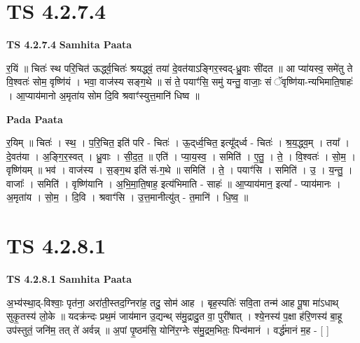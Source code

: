 \documentclass[17pt]{extarticle}
\begin{document}

\section{ TS 4.2.7.4 }

\textbf{TS 4.2.7.4 } \newline
\textbf{Samhita Paata} \newline

र॒यिं ॥ चितः॑ स्थ परि॒चित॑ ऊर्द्ध्व॒चितः॑ श्रयद्ध्वं॒ तया॑ दे॒वत॑याऽङ्गिर॒स्वद्-ध्रु॒वाः सी॑दत ॥ आ प्या॑यस्व॒ समे॑तु ते वि॒श्वतः॑ सोम॒ वृष्णि॑यं । भवा॒ वाज॑स्य सङ्ग॒थे ॥ सं ते॒ पयाꣳ॑सि॒ समु॑ यन्तु॒ वाजाः॒ सं ॅवृष्णि॑या-न्यभिमाति॒षाहः॑ । आ॒प्याय॑मानो अ॒मृता॑य सोम दि॒वि श्रवाꣳ॑स्युत्त॒मानि॑ धिष्व ॥ \newline

\textbf{Pada Paata} \newline

र॒यिम् ॥ चितः॑ । स्थ॒ । प॒रि॒चित॒ इति॑ परि - चितः॑ । ऊ॒द्‌र्ध्व॒चित॒ इत्यू᳚द्‌र्ध्व - चितः॑ । श्र॒य॒द्ध्व॒म् । तया᳚ । दे॒वत॑या । अ॒ङ्गि॒र॒स्वत् । ध्रु॒वाः । सी॒द॒त॒ ॥ एति॑ । प्या॒य॒स्व॒ । समिति॑ । ए॒तु॒ । ते॒ । वि॒श्वतः॑ । सो॒म॒ । वृष्णि॑यम् ॥ भव॑ । वाज॑स्य । स॒ङ्ग॒थ इति॑ सं-ग॒थे ॥ समिति॑ । ते॒ । पयाꣳ॑सि । समिति॑ । उ॒ । य॒न्तु॒ । वाजाः᳚ । समिति॑ । वृष्णि॑यानि । अ॒भि॒मा॒ति॒षाह॒ इत्य॑भिमाति - साहः॑ ॥ आ॒प्याय॑मान॒ इत्या᳚ - प्याय॑मानः । अ॒मृता॑य । सो॒म॒ । दि॒वि । श्रवाꣳ॑सि । उ॒त्त॒मानीत्यु॑त् - त॒मानि॑ । धि॒ष्व॒ ॥  \newline





\section{ TS 4.2.8.1 }

\textbf{TS 4.2.8.1 } \newline
\textbf{Samhita Paata} \newline

अ॒भ्य॑स्था॒द्-विश्वाः॒ पृत॑ना॒ अरा॑ती॒स्तद॒ग्निरा॑ह॒ तदु॒ सोम॑ आह । बृह॒स्पतिः॑ सवि॒ता तन्म॑ आह पू॒षा मा॑ऽधाथ् सुकृ॒तस्य॑ लो॒के ॥ यदक्र॑न्दः प्रथ॒मं जाय॑मान उ॒द्यन्थ् स॑मु॒द्रादु॒त वा॒ पुरी॑षात् । श्ये॒नस्य॑ प॒क्षा ह॑रि॒णस्य॑ बा॒हू उप॑स्तुतं॒ जनि॑म॒ तत् ते॑ अर्वन्न् ॥ अ॒पां पृ॒ष्ठम॑सि॒ योनि॑र॒ग्नेः स॑मु॒द्रम॒भितः॒ पिन्व॑मानं । वर्द्ध॑मानं म॒ह - [  ] \newline
\end{document}
